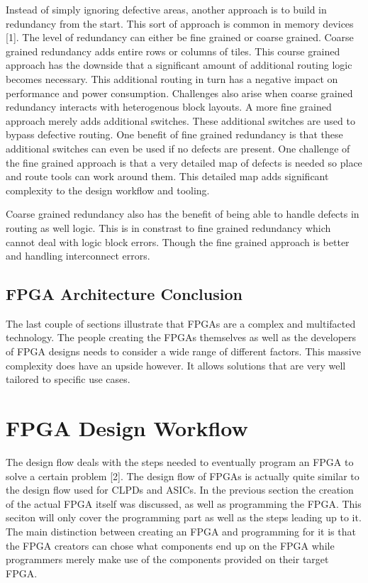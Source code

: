 \documentclass{article}
\begin{document}
    Instead of simply ignoring defective areas, another approach is to build in redundancy
    from the start. This sort of approach is common in memory devices [1]. The level of
    redundancy can either be fine grained or coarse grained. Coarse grained redundancy
    adds entire rows or columns of tiles. This course grained approach has the downside
    that a significant amount of additional routing logic becomes necessary. This
    additional routing in turn has a negative impact on performance and power consumption.
    Challenges also arise when coarse grained redundancy interacts with heterogenous
    block layouts.
    A more fine grained approach merely adds additional switches. These additional switches
    are used to bypass defective routing. One benefit of fine grained redundancy is that
    these additional switches can even be used if no defects are present.
    One challenge of the fine grained approach is that a very detailed map
    of defects is needed so place and route tools can work around them.
    This detailed map adds significant complexity to the design workflow and tooling.

    Coarse grained redundancy also has the benefit of being able to handle defects in
    routing as well logic. This is in constrast to fine grained redundancy which
    cannot deal with logic block errors. Though the fine grained approach is better
    and handling interconnect errors.

    
    \subsection{FPGA Architecture Conclusion}

    The last couple of sections illustrate that FPGAs are a complex and multifacted
    technology. The people creating the FPGAs themselves as well as the developers
    of FPGA designs needs to consider a wide range of different factors. This massive
    complexity does have an upside however. It allows solutions that are very well
    tailored to specific use cases. 
    
    
    \section{FPGA Design Workflow}

    The design flow deals with the steps needed to eventually program an FPGA
    to solve a certain problem [2]. The design flow of FPGAs is actually quite
    similar to the design flow used for CLPDs and ASICs.
    In the previous section the creation of the actual FPGA itself was discussed,
    as well as programming the FPGA. This seciton will only cover the programming
    part as well as the steps leading up to it.
    The main distinction between creating an FPGA and programming for it is that
    the FPGA creators can chose what components end up on the FPGA while programmers
    merely make use of the components provided on their target FPGA.
\end{document}
